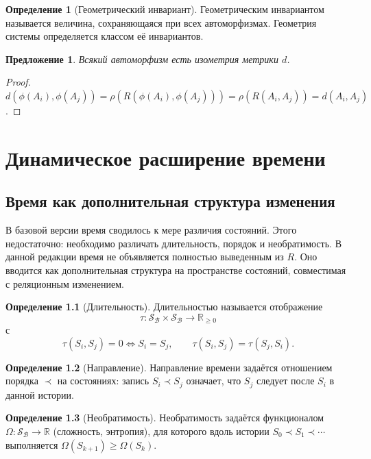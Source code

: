\documentclass[12pt,a4paper,oneside]{book}
\theoremstyle{definition}
\newtheorem{definition}{Определение}[chapter]
\theoremstyle{plain}
\newtheorem{proposition}{Предложение}[chapter]
\theoremstyle{remark}
\newcommand{\SubParts}{\mathcal B}
\newcommand{\Rel}{R}
\newcommand{\State}{S}
\newcommand{\States}{\mathcal S}
\newcommand{\norm}{\rho}
\begin{document}
\begin{definition}[Геометрический инвариант]
Геометрическим инвариантом называется величина, сохраняющаяся при всех автоморфизмах.
Геометрия системы определяется классом её инвариантов.
\end{definition}

\begin{proposition}
Всякий автоморфизм есть изометрия метрики $d$.
\end{proposition}

\begin{proof}
$d(\phi(A_i),\phi(A_j))=\norm(\Rel(\phi(A_i),\phi(A_j)))=\norm(\Rel(A_i,A_j))=d(A_i,A_j)$.
\end{proof}

\chapter{Динамическое расширение времени}

\section{Время как дополнительная структура изменения}

В базовой версии время сводилось к мере различия состояний. Этого недостаточно:
необходимо различать длительность, порядок и необратимость. В данной редакции время
не объявляется полностью выведенным из $\Rel$. Оно вводится как дополнительная
структура на пространстве состояний, совместимая с реляционным изменением.

\begin{definition}[Длительность]
Длительностью называется отображение
\[
\tau:\States_{\SubParts}\times\States_{\SubParts}\to\mathbb R_{\ge0}
\]
с
\[
\tau(\State_i,\State_j)=0\iff\State_i=\State_j,\qquad
\tau(\State_i,\State_j)=\tau(\State_j,\State_i).
\]
\end{definition}

\begin{definition}[Направление]
Направление времени задаётся отношением порядка $\prec$ на состояниях: запись
$\State_i\prec\State_j$ означает, что $\State_j$ следует после $\State_i$ в данной
истории.
\end{definition}

\begin{definition}[Необратимость]
Необратимость задаётся функционалом $\Omega:\States_{\SubParts}\to\mathbb R$ (сложность,
энтропия), для которого вдоль истории $\State_0\prec\State_1\prec\cdots$ выполняется
$\Omega(\State_{k+1})\ge\Omega(\State_k)$.
\end{definition}
\end{document}
